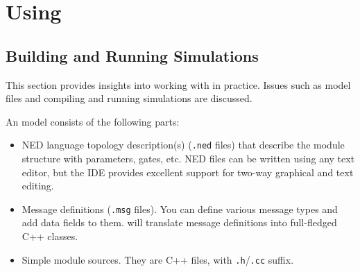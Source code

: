 %
%
%
%
%
%
%


\section{Using {\opp}}
\label{sec:overview:using-omnetpp}


\subsection{Building and Running Simulations}
\label{sec:overview:building-and-running-simulations}

This section provides insights into working with {\opp} in practice.
Issues such as model files and compiling and running simulations are
discussed.

An {\opp} model consists of the following parts:
\begin{itemize}
  \item{NED language topology description(s) (\texttt{.ned} files)
    that describe the module structure with parameters, gates, etc.
    NED files can be written using any text editor, but the {\opp} IDE
    provides excellent support for two-way graphical and text editing.}
  \item{Message definitions (\texttt{.msg} files). You can define various message
    types and add data fields to them. {\opp} will translate message definitions
    into full-fledged C++ classes.}
  \item{Simple module sources. They are C++ files, with \texttt{.h}/\texttt{.cc} suffix.}
\end{itemize}

